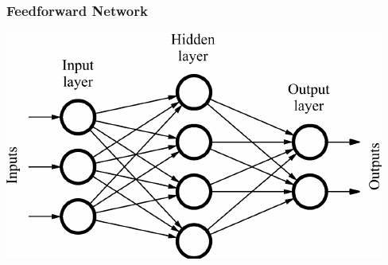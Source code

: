 \begin{frame}
	\frametitle{Feedforward Network}
	\includegraphics[scale=0.5]{feedforward_neuralnet}
\end{frame}
